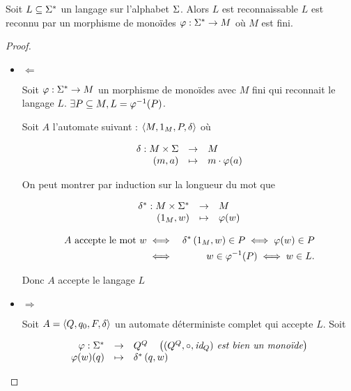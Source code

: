 \begin{prop}
	Soit $L \subseteq \Sigma^{*}$ un langage sur l'alphabet $\Sigma$. Alors $L$ est reconnaissable \ssi $L$ est reconnu par un morphisme de monoïdes $\varphi : \Sigma^{*} \to M$ où $M$ est fini.
\end{prop}


\begin{proof}
	\begin{itemize}
		\item $\Leftarrow$

		      Soit $\varphi : \Sigma^{*} \to M$ un morphisme de monoïdes avec $M$ fini qui reconnait le langage $L$.
		      $\exists P \subseteq M, L = \varphi^{-1} (P)$.

		      Soit $A$ l'automate suivant : $\langle M, 1_M, P, \delta \rangle$ où

		      $$ \begin{array}{rcl}
				      \delta : M \times \Sigma & \to     & M                \\
				      (m,a)                       & \mapsto & m \cdot \varphi (a)
			      \end{array} $$

		      On peut montrer par induction sur la longueur du mot que

		      $$ \begin{array}{rcl}
				      \delta ^* : M \times \Sigma^{*} & \to     & M        \\
				      (1_M, w)                   & \mapsto & \varphi (w)
			      \end{array} $$

		      \ssi
		      \begin{eqnarray*}
			      A \text{ accepte le mot } w &\iff&  \delta^{*} \left(1_M,w\right) \in P \iff \varphi (w) \in P \\
			      &\iff&  w \in \varphi^{-1}(P) \iff w \in L.
		      \end{eqnarray*}

		      Donc $A$ accepte le langage $L$


		\item $\Rightarrow$

		      Soit $A = \langle Q, q_0, F, \delta \rangle$ un automate déterministe complet qui accepte $L$.
		      Soit

		      $$ \begin{array}{rcl}
				      \varphi : \Sigma^{*} & \to     & Q^Q        \quad\left(\textit{$(Q^Q, \circ,\text{id}_Q) $ est bien un monoïde}\right) \\
				      \varphi (w)(q)  & \mapsto & \delta^{*} \left(q,w\right)
			      \end{array} $$


\end{itemize}
\end{proof}
